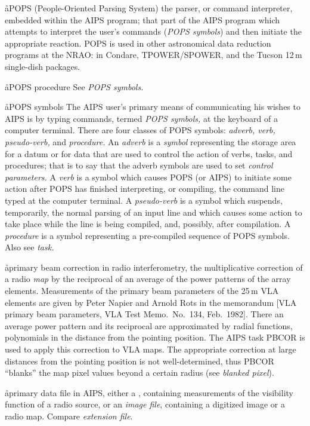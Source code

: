 \aa{POPS}
(People-Oriented Parsing System) the parser, or command
interpreter, embedded within the AIPS program; that part
of the AIPS program which attempts to interpret the user's
commands ({\it POPS symbols}\/) and then initiate the appropriate reaction.
POPS is used in other astronomical data reduction
programs at the NRAO: in Condare, TPOWER/SPOWER, and the
Tucson 12\,m single-dish packages.

\aa{POPS procedure} See {\it POPS symbols.}

\aa{POPS symbols}
The AIPS user's primary means of communicating his wishes
to AIPS is by typing commands,
termed {\it POPS symbols,} at the keyboard of a computer terminal.
There are four classes of POPS symbols: {\it adverb, verb,
pseudo-verb,} and {\it procedure.}
An {\it adverb} is a {\it symbol} representing the storage area
for a datum or for data that are used to control the action of
verbs, tasks, and procedures; that is to say that the adverb symbols
are used to set {\sl control parameters.}
A {\it verb} is a symbol which causes POPS (or AIPS) to
initiate some action after POPS has finished interpreting,
or compiling, the command line typed at the computer terminal.
A {\it pseudo-verb}
is a symbol which suspends, temporarily, the normal parsing
of an input line and which causes some action to take place
while the line is being compiled, and, possibly, after compilation.
A {\it procedure}
is a symbol representing a pre-compiled sequence of POPS symbols.
Also see {\it task.}

\aa{primary beam correction}
in radio interferometry, the multiplicative correction of a radio {\it map}
by the reciprocal of an average of the power patterns of the array elements.
Measurements of the primary beam parameters of the 25\,m VLA elements
are given by Peter Napier and Arnold Rots in the memorandum
[VLA primary beam parameters, VLA Test Memo.\ No.~134, Feb.~1982].
There an average power pattern and its reciprocal are approximated by radial
functions, polynomials in the distance from the pointing position.
The AIPS task PBCOR is used to apply this correction to VLA maps.
The appropriate correction at large distances from the pointing position
is not well-determined, thus
PBCOR ``blanks'' the map pixel values beyond a certain radius (see
{\it blanked pixel}\/).

\aa{primary data file}
in AIPS, either a , containing measurements of
the visibility function of a radio source, or an {\it image
file}, containing a digitized image or a radio map.
Compare {\it extension file}.

